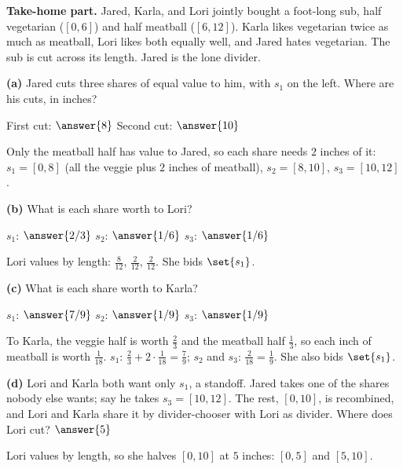 \documentclass[12pt]{ximera}
\begin{document}
\begin{problem}
\textbf{Take-home part.} Jared, Karla, and Lori jointly bought a foot-long sub, half
vegetarian ($[0,6]$) and half meatball ($[6,12]$). Karla likes vegetarian twice as much as
meatball, Lori likes both equally well, and Jared hates vegetarian. The sub is cut across
its length. Jared is the lone divider.

\begin{prompt}
\textbf{(a)} Jared cuts three shares of equal value to him, with $s_1$ on the left. Where
are his cuts, in inches?

First cut: $\answer{8}$ \quad Second cut: $\answer{10}$
\begin{feedback}
Only the meatball half has value to Jared, so each share needs $2$ inches of it:
$s_1=[0,8]$ (all the veggie plus $2$ inches of meatball), $s_2=[8,10]$,
$s_3=[10,12]$.
\end{feedback}
\end{prompt}

\begin{prompt}
\textbf{(b)} What is each share worth to Lori?

$s_1$: $\answer{2/3}$ \quad $s_2$: $\answer{1/6}$ \quad $s_3$: $\answer{1/6}$
\begin{feedback}
Lori values by length: $\frac8{12}$, $\frac2{12}$, $\frac2{12}$. She bids $\set{s_1}$.
\end{feedback}
\end{prompt}

\begin{prompt}
\textbf{(c)} What is each share worth to Karla?

$s_1$: $\answer{7/9}$ \quad $s_2$: $\answer{1/9}$ \quad $s_3$: $\answer{1/9}$
\begin{feedback}
To Karla, the veggie half is worth $\frac23$ and the meatball half $\frac13$, so each
inch of meatball is worth $\frac1{18}$. $s_1$: $\frac23+2\cdot\frac1{18}=\frac79$;
$s_2$ and $s_3$: $\frac2{18}=\frac19$. She also bids $\set{s_1}$.
\end{feedback}
\end{prompt}

\begin{prompt}
\textbf{(d)} Lori and Karla both want only $s_1$, a standoff. Jared takes one of the shares
nobody else wants; say he takes $s_3=[10,12]$. The rest, $[0,10]$, is recombined, and Lori
and Karla share it by divider-chooser with Lori as divider. Where does Lori cut?
$\answer{5}$

\begin{feedback}
Lori values by length, so she halves $[0,10]$ at $5$ inches: $[0,5]$ and $[5,10]$.
\end{feedback}
\end{prompt}


\end{problem}
\end{document}
